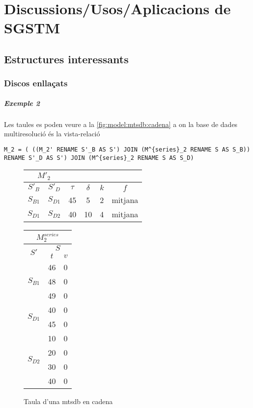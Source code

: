 \chapter{Discussions/Usos/Aplicacions de SGSTM}



\section{Estructures interessants}



\subsection{Discos enllaçats}



\paragraph{Exemple 2}

Les taules es poden veure a la \autoref{fig:model:mtsdb:cadena} a on la base de dades multiresolució és la vista-relació 
\begin{verbatim}
M_2 = ( ((M_2' RENAME S'_B AS S') JOIN (M^{series}_2 RENAME S AS S_B)) RENAME S'_D AS S') JOIN (M^{series}_2 RENAME S AS S_D)
\end{verbatim}



\begin{figure}[tp]
  \centering
  \begin{tabular}{|c|c|c|c|c|c|}
    \multicolumn{2}{c}{$M'_2$} \\ \hline
    $S'_B$  & $S'_D$ & $\tau$ & $\delta$ & $k$ & $f$ \\ \hline
    $S_{B1}$ & $S_{D1}$ & 45 & 5  & 2 & mitjana  \\
    $S_{D1}$ & $S_{D2}$ & 40 & 10 & 4 & mitjana  \\ \hline
  \end{tabular}\qquad
  \begin{tabular}{|c|c|c|}
    \multicolumn{3}{c}{$M^{series}_{2}$} \\ \hline
    \multirow{2}{*}{$S'$}  &  \multicolumn{2}{c|}{$S$} \\ \cline{2-3}
    & $t$      & $v$  \\ \hline
    \multirow{3}{*}{$S_{B1}$} & 46 & 0 \\ 
    & 48 & 0 \\ 
    & 49 & 0 \\ \hline
    \multirow{2}{*}{$S_{D1}$} & 40 & 0 \\ 
    & 45 & 0 \\ \hline
    \multirow{4}{*}{$S_{D2}$} & 10 & 0 \\ 
    & 20 & 0 \\ 
    & 30 & 0 \\ 
    & 40 & 0 \\ \hline
  \end{tabular}
  \caption{Taula d'una mtsdb en cadena}
  \label{fig:model:mtsdb:cadena}
\end{figure}

